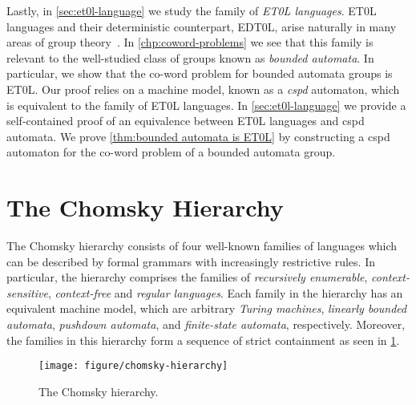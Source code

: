 Lastly, in \cref{sec:et0l-language} we study the family of \emph{ET0L languages}.
ET0L languages and their deterministic counterpart, EDT0L, arise naturally in many areas of group theory~\cite{ciobanu2016a,ciobanu2018,ciobanu2019,evetts2020,diekert2017,ciobanu2020}.
In \cref{chp:coword-problems} we see that this family is relevant to the well-studied class of groups known as \emph{bounded automata}.
In particular, we show that the co-word problem for bounded automata groups is ET0L.
Our proof relies on a machine model, known as a \emph{cspd} automaton, which is equivalent to the family of ET0L languages.
In \cref{sec:et0l-language} we provide a self-contained proof of an equivalence between ET0L languages and cspd automata.
We prove \cref{thm:bounded automata is ET0L} by constructing a cspd automaton for the co-word problem of a bounded automata group.

\section{The Chomsky Hierarchy}%
\label{sec:grammars-and-automata}

The Chomsky hierarchy consists of four well-known families of languages which can be described by formal grammars with increasingly restrictive rules.
In particular, the hierarchy comprises the families of \emph{recursively enumerable}, \emph{context-sensitive}, \emph{context-free} and \emph{regular languages}.
Each family in the hierarchy has an equivalent machine model, which are arbitrary \emph{Turing machines}, \emph{linearly bounded automata}, \emph{pushdown automata}, and \emph{finite-state automata}, respectively.
Moreover, the families in this hierarchy form a sequence of strict containment as seen in \cref{fig:chomsky-heirachy}.

\begin{figure}[!ht]
	\centering
	\texttt{[image: figure/chomsky-hierarchy]}
	\caption{The Chomsky hierarchy.}\label{fig:chomsky-heirachy}
\end{figure}

